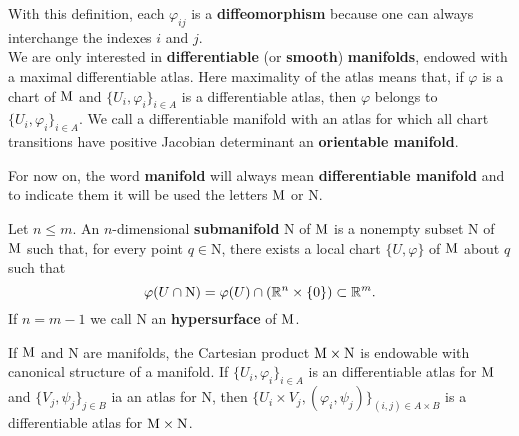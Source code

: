 	\noindent With this definition, each $\varphi_{ij}$ is a \textbf{diffeomorphism} because one can always interchange the indexes $i$ and $j$.\\



	\noindent We are only interested in \textbf{differentiable} (or \textbf{smooth}) \textbf{manifolds}, endowed with a maximal differentiable atlas. Here maximality of the atlas means that, if $\varphi$ is a chart of $\mathrm{M}$ and $\{U_i,\varphi_i\}_{i\in A}$ is a differentiable atlas, then $\varphi$ belongs to $\{U_i,\varphi_i\}_{i\in A}$. We call a differentiable manifold with an atlas for which all chart transitions have positive Jacobian determinant an \textbf{orientable manifold}.
\begin{rem}
	For now on, the word \textbf{manifold} will always mean \textbf{differentiable manifold} and to indicate them it will be used the letters $\mathrm{M}$ or $\mathrm{N}$.
\end{rem}


\begin{definition}
	Let $n\leq m$. An $n$-dimensional \textbf{submanifold} $\mathrm{N}$ of $\mathrm{M}$ is a nonempty subset $\mathrm{N}$ of $\mathrm{M}$ such that, for every point $q\in\mathrm{N}$, there exists a local chart $\{U,\varphi\}$ of $\mathrm{M}$ about $q$ such that
	$$\varphi(U\cap \mathrm{N})=\varphi(U)\cap({\mathbb R}^n\times\{0\})\subset{\mathbb R}^m.$$ If $n=m-1$ we call $\mathrm{N}$ an \textbf{hypersurface} of $\mathrm{M}$.
\end{definition}

\begin{example}
	If $\mathrm{M}$ and $\mathrm{N}$ are manifolds, the Cartesian product $\mathrm{M}\times\mathrm{N}$ is endowable with canonical structure of a manifold. If $\{U_i,\varphi_i\}_{i\in A}$ is an differentiable atlas for $\mathrm{M}$ and $\{V_j,\psi_j\}_{j\in B}$ ia an atlas for $\mathrm{N}$, then $\big\{U_i\times V_j,(\varphi_i,\psi_j)\big\}_{(i,j)\in A\times B}$ is a differentiable atlas for $\mathrm{M}\times\mathrm{N}$.
\end{example}

